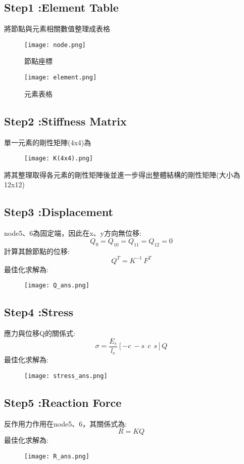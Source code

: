 \documentclass[a4paper]{article}
\begin{document}
    \subsection{Step1 :Element Table}
    將節點與元素相關數值整理成表格
    \begin{figure}[h]
    \centering \texttt{[image: node.png]}
    \caption{節點座標}
    \end{figure}
    
    \begin{figure}[h]
    \centering \texttt{[image: element.png]}
    \caption{元素表格}
    \end{figure}

    \subsection{Step2 :Stiffness Matrix}
    單一元素的剛性矩陣(4x4)為\\
    \begin{figure}[H]
    \centering \texttt{[image: K(4x4).png]}
    \end{figure}
    將其整理取得各元素的剛性矩陣後並進一步得出整體結構的剛性矩陣(大小為12x12)

    \subsection{Step3 :Displacement}
    node5、6為固定端，因此在x、y方向無位移:
    \[Q_{9} = Q_{10} = Q_{11} = Q_{12} = 0\]
    計算其餘節點的位移:
    \[Q^T = K^{-1}\,F^T\]
    最佳化求解為:
    \begin{figure}[H]
    \centering \texttt{[image: Q\_ans.png]}
    \end{figure}
    
    \subsection{Step4 :Stress}
    應力與位移Q的關係式:
    \[\sigma = \frac{E_{e}}{l_{e}}[-c\ -s\ \ c\ \ s]Q\]
    最佳化求解為:
    \begin{figure}[H]
    \centering \texttt{[image: stress\_ans.png]}
    \end{figure}
    
    \newpage
    \subsection{Step5 :Reaction Force}
    反作用力作用在node5、6，其關係式為:
    \[R = KQ\]
    最佳化求解為:
    \begin{figure}[H]
    \centering \texttt{[image: R\_ans.png]}
    \end{figure}
\end{document}
